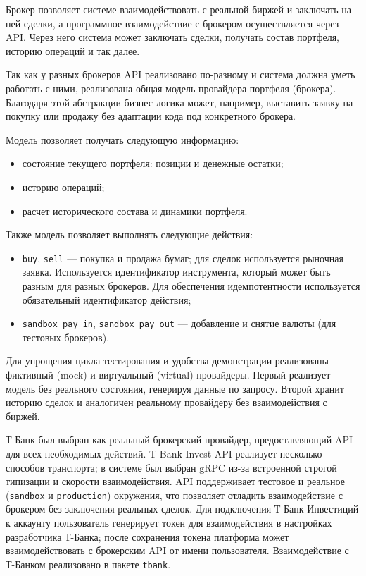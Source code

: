 \documentclass[14pt]{gost-7-32}
\begin{document}
Брокер позволяет системе взаимодействовать с реальной биржей и заключать на ней сделки, а программное взаимодействие с брокером осуществляется через API. Через него система может заключать сделки, получать состав портфеля, историю операций и так далее.

Так как у разных брокеров API реализовано по-разному и система должна уметь работать с ними, реализована общая модель провайдера портфеля (брокера). Благодаря этой абстракции бизнес-логика может, например, выставить заявку на покупку или продажу без адаптации кода под конкретного брокера.

Модель позволяет получать следующую информацию:
\begin{itemize}
 \item состояние текущего портфеля: позиции и денежные остатки;
 \item историю операций;
 \item расчет исторического состава и динамики портфеля.
\end{itemize}
Также модель позволяет выполнять следующие действия:
\begin{itemize}
 \item \texttt{buy}, \texttt{sell} --- покупка и продажа бумаг; для сделок используется рыночная заявка. Используется идентификатор инструмента, который может быть разным для разных брокеров. Для обеспечения идемпотентности используется обязательный идентификатор действия;
 \item \texttt{sandbox\_pay\_in}, \texttt{sandbox\_pay\_out} --- добавление и снятие валюты (для тестовых брокеров).
\end{itemize}

Для упрощения цикла тестирования и удобства демонстрации реализованы фиктивный (mock) и виртуальный (virtual) провайдеры. Первый реализует модель без реального состояния, генерируя данные по запросу. Второй хранит историю сделок и аналогичен реальному провайдеру без взаимодействия с биржей.

Т-Банк был выбран как реальный брокерский провайдер, предоставляющий API для всех необходимых действий. T-Bank Invest API реализует несколько способов транспорта; в системе был выбран gRPC из-за встроенной строгой типизации и скорости взаимодействия. API поддерживает тестовое и реальное (\texttt{sandbox} и \texttt{production}) окружения, что позволяет отладить взаимодействие с брокером без заключения реальных сделок. Для подключения Т-Банк Инвестиций к аккаунту пользователь генерирует токен для взаимодействия в настройках разработчика Т-Банка; после сохранения токена платформа может взаимодействовать с брокерским API от имени пользователя. Взаимодействие с Т-Банком реализовано в пакете \texttt{tbank}.
\end{document}
